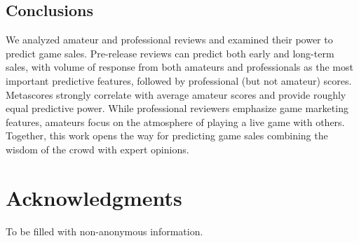 \documentclass[letterpaper]{article}
\begin{document}
\subsection{Conclusions}
We analyzed amateur and professional reviews and examined their power to predict game sales. Pre-release reviews can predict both early and long-term sales, with volume of response from both amateurs and professionals as the most important predictive features, followed by professional (but not amateur) scores. Metascores strongly correlate with average amateur scores and provide roughly equal predictive power. While professional reviewers emphasize game marketing features, amateurs focus on the atmosphere of playing a live game with others. Together, this work opens the way for predicting game sales combining the wisdom of the crowd with expert opinions.

\section{Acknowledgments}
To be filled with non-anonymous information.



\end{document}
